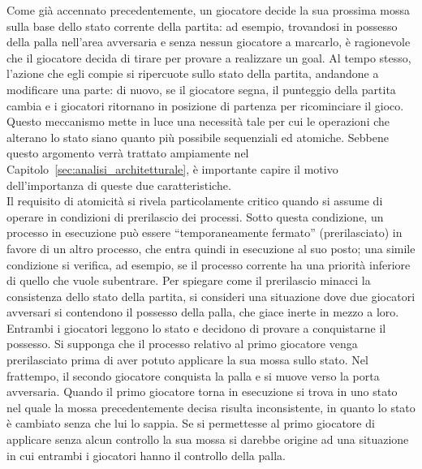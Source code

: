 Come già accennato precedentemente, un giocatore decide la sua prossima mossa sulla base dello stato corrente della partita: ad esempio, trovandosi in possesso della palla nell'area avversaria e senza nessun giocatore a marcarlo, è ragionevole che il giocatore decida di tirare per provare a realizzare un goal. Al tempo stesso, l'azione che egli compie si ripercuote sullo stato della partita, andandone a modificare una parte: di nuovo, se il giocatore segna, il punteggio della partita cambia e i giocatori ritornano in posizione di partenza per ricominciare il gioco. Questo meccanismo mette in luce una necessità tale per cui le operazioni che alterano lo stato siano quanto più possibile sequenziali ed atomiche. Sebbene questo argomento verrà trattato ampiamente nel Capitolo~\ref{sec:analisi_architetturale}, è importante capire il motivo dell'importanza di queste due caratteristiche.\\

Il requisito di atomicità si rivela particolamente critico quando si assume di operare in condizioni di prerilascio dei processi. Sotto questa condizione, un processo in esecuzione può essere ``temporaneamente fermato'' (prerilasciato) in favore di un altro processo, che entra quindi in esecuzione al suo posto; una simile condizione si verifica, ad esempio, se il processo corrente ha una priorità inferiore di quello che vuole subentrare. Per spiegare come il prerilascio minacci la consistenza dello stato della partita, si consideri una situazione dove due giocatori avversari si contendono il possesso della palla, che giace inerte in mezzo a loro. Entrambi i giocatori leggono lo stato e decidono di provare a conquistarne il possesso. Si supponga che il processo relativo al primo giocatore venga prerilasciato prima di aver potuto applicare la sua mossa sullo stato. Nel frattempo, il secondo giocatore conquista la palla e si muove verso la porta avversaria. Quando il primo giocatore torna in esecuzione si trova in uno stato nel quale la mossa precedentemente decisa risulta inconsistente, in quanto lo stato è cambiato senza che lui lo sappia. Se si permettesse al primo giocatore di applicare senza alcun controllo la sua mossa si darebbe origine ad una situazione in cui entrambi i giocatori hanno il controllo della palla.\\

